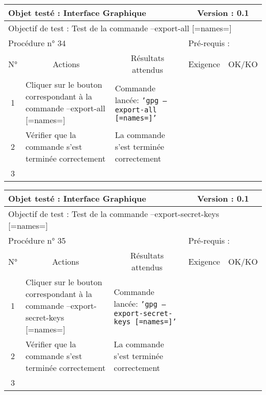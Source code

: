 \documentclass{../res/univ-projet}
\begin{document}
\begin{center}
\begin{tabular}{|c|p{5cm}|p{5cm}|p{1.5cm}|p{1.5cm}|}
\hline
\multicolumn{3}{|l|}{Objet testé : Interface Graphique} & \multicolumn{2}{c|}{Version : 0.1}\\ \hline
\multicolumn{5}{|l|}{Objectif de test : Test de la commande –export-all [=names=]}\\ \hline
\multicolumn{3}{|l|}{Procédure n° 34} & \multicolumn{2}{p{3cm}|}{Pré-requis : }\\ \hline
\multicolumn{1}{|c|}{N°} & \multicolumn{1}{c|}{Actions} & \multicolumn{1}{c|}{Résultats attendus} & 
\multicolumn{1}{c|}{Exigence} & \multicolumn{1}{c|}{OK/KO}\\ \hline
1 & Cliquer sur le bouton correspondant à la commande –export-all [=names=] & Commande lancée: \texttt{'gpg –export-all [=names=]'} &  & \\
2 & Vérifier que la commande s'est terminée correctement & La commande s'est terminée correctement &  & \\
3 &  &  &  & \\ \hline
\end{tabular}
\vskip 2.2cm


\begin{tabular}{|c|p{5cm}|p{5cm}|p{1.5cm}|p{1.5cm}|}
\hline
\multicolumn{3}{|l|}{Objet testé : Interface Graphique} & \multicolumn{2}{c|}{Version : 0.1}\\ \hline
\multicolumn{5}{|l|}{Objectif de test : Test de la commande –export-secret-keys [=names=]}\\ \hline
\multicolumn{3}{|l|}{Procédure n° 35} & \multicolumn{2}{p{3cm}|}{Pré-requis : }\\ \hline
\multicolumn{1}{|c|}{N°} & \multicolumn{1}{c|}{Actions} & \multicolumn{1}{c|}{Résultats attendus} & 
\multicolumn{1}{c|}{Exigence} & \multicolumn{1}{c|}{OK/KO}\\ \hline
1 & Cliquer sur le bouton correspondant à la commande –export-secret-keys [=names=] & Commande lancée: \texttt{'gpg –export-secret-keys [=names=]'} &  & \\
2 & Vérifier que la commande s'est terminée correctement & La commande s'est terminée correctement &  & \\
3 &  &  &  & \\ \hline
\end{tabular}
\vskip 2.2cm



\end{center}
\end{document}
